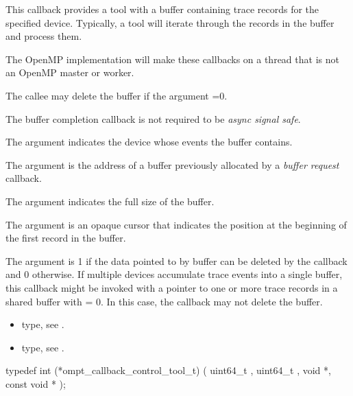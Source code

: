 \descr
This callback provides a tool with a buffer containing trace records for the
specified device. Typically, a tool will iterate through the records
in the buffer and process them.

The OpenMP implementation will make these callbacks
on a thread that is not an OpenMP master or worker.

The callee may delete the buffer if the argument
=0.

The buffer completion callback is not
required to be \emph{async signal safe}.

\argdesc

The argument  indicates the device whose events
the buffer contains.

The argument  is the address of a buffer previously
allocated by a \emph{buffer request} callback.

The argument  indicates the full size of the buffer.

The argument  is an opaque cursor that indicates the
position at the beginning of the first record in the buffer.

The argument  is 1 if the data pointed to by
buffer can be deleted by the callback and 0 otherwise. If multiple
devices accumulate trace events into a single buffer, this callback
might be invoked with a pointer to one or more trace records in a
shared buffer with  = 0. In this case, the callback
may not delete the buffer.

\crossreferences
\begin{itemize}
\item {} type, see
.
\item {} type, see
.
\end{itemize}

\label{sec:ompt_callback_control_tool_t}
\format

\begin{ccppspecific}
\begin{omptCallback}
typedef int (*ompt_callback_control_tool_t) (
  uint64_t ,
  uint64_t ,
  void *,
  const void *
);
\end{omptCallback}
\end{ccppspecific}


